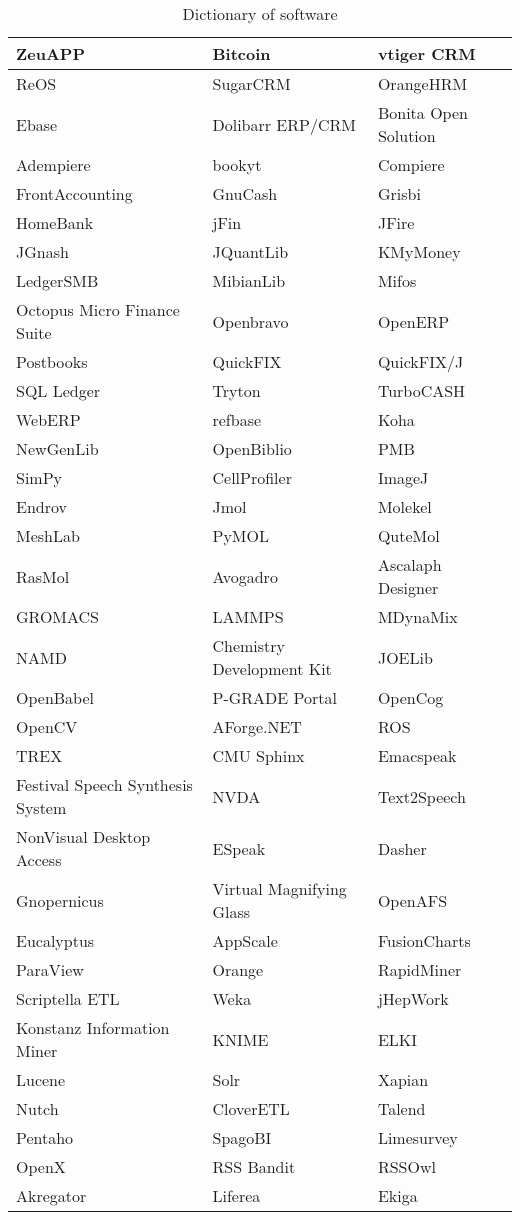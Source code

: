 \begin{table}
\begin{center}
\begin{tabular}{|l|l|l|}\hline
ZeuAPP&Bitcoin&vtiger CRM\\\hline
ReOS&SugarCRM&OrangeHRM\\\hline
Ebase&Dolibarr ERP/CRM&Bonita Open Solution\\\hline
Adempiere&bookyt&Compiere\\\hline
FrontAccounting&GnuCash&Grisbi\\\hline
HomeBank&jFin&JFire\\\hline
JGnash&JQuantLib&KMyMoney\\\hline
LedgerSMB&MibianLib&Mifos\\\hline
Octopus Micro Finance Suite&Openbravo&OpenERP\\\hline
Postbooks&QuickFIX&QuickFIX/J\\\hline
SQL Ledger&Tryton&TurboCASH\\\hline
WebERP&refbase&Koha\\\hline
NewGenLib&OpenBiblio&PMB\\\hline
SimPy&CellProfiler&ImageJ\\\hline
Endrov&Jmol&Molekel\\\hline
MeshLab&PyMOL&QuteMol\\\hline
RasMol&Avogadro&Ascalaph Designer\\\hline
GROMACS&LAMMPS&MDynaMix\\\hline
NAMD&Chemistry Development Kit&JOELib\\\hline
OpenBabel&P-GRADE Portal&OpenCog\\\hline
OpenCV&AForge.NET&ROS\\\hline
TREX&CMU Sphinx&Emacspeak\\\hline
Festival Speech Synthesis System&NVDA&Text2Speech\\\hline
NonVisual Desktop Access&ESpeak&Dasher\\\hline
Gnopernicus&Virtual Magnifying Glass&OpenAFS\\\hline
Eucalyptus&AppScale&FusionCharts\\\hline
ParaView&Orange&RapidMiner\\\hline
Scriptella ETL&Weka&jHepWork\\\hline
Konstanz Information Miner&KNIME&ELKI\\\hline
Lucene&Solr&Xapian\\\hline
Nutch&CloverETL&Talend\\\hline
Pentaho&SpagoBI&Limesurvey\\\hline
OpenX&RSS Bandit&RSSOwl\\\hline
Akregator&Liferea&Ekiga\\\hline
\end{tabular}
\end{center}
\caption{Dictionary of software}
\end{table}
